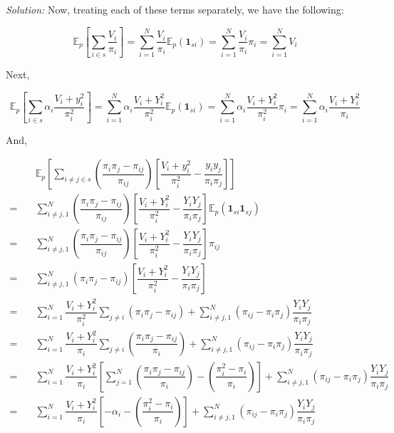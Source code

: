\documentclass[12pt]{article}
\newcommand{\E}{\mathbb{E}}
\theoremstyle{definition}
\newenvironment{answer}{\textit{Solution: }\quad }{ \hfill \qedsymbol}
\begin{document}
\begin{answer}
	Now, treating each of these terms separately, we have the following:

	$$\E_p \left[ \sum_{i \in s} \dfrac{V_i}{\pi_i} \right]
	= \sum_{i=1}^{N} \dfrac{V_i}{\pi_i} \E_p(\bm{1}_{si})
	= \sum_{i=1}^{N} \dfrac{V_i}{\pi_i} \pi_i
	= \sum_{i=1}^{N} V_i$$

	Next,

	$$\E_p \left[ \sum_{i \in s}\alpha_i \dfrac{V_i + y_i^2}{\pi_i^2} \right]
	= \sum_{i=1}^{N} \alpha_i \dfrac{V_i + Y_i^2}{\pi_i^2} \E_p(\bm{1}_{si})
	= \sum_{i=1}^{N} \alpha_i \dfrac{V_i + Y_i^2}{\pi_i^2} \pi_i
	= \sum_{i=1}^{N} \alpha_i \dfrac{V_i + Y_i^2}{\pi_i}$$


	And,

	\begin{align*}
		& \E_p \left[ \sum_{i \neq j \in s} \left( \dfrac{\pi_i \pi_j - \pi_{ij}}{\pi_{ij}} \right) \left[ \dfrac{V_i + y_i^2}{\pi_i^2} - \dfrac{y_i y_j}{\pi_i \pi_j} \right] \right]\\
		= \quad & \sum_{i\neq j, 1}^{N} \left( \dfrac{\pi_i \pi_j - \pi_{ij}}{\pi_{ij}} \right) \left[ \dfrac{V_i + Y_i^2}{\pi_i^2} - \dfrac{Y_i Y_j}{\pi_i \pi_j} \right] \E_p(\bm{1}_{si} \bm{1}_{sj})\\
		= \quad & \sum_{i\neq j, 1}^{N} \left( \dfrac{\pi_i \pi_j - \pi_{ij}}{\pi_{ij}} \right) \left[ \dfrac{V_i + Y_i^2}{\pi_i^2} - \dfrac{Y_i Y_j}{\pi_i \pi_j} \right] \pi_{ij}\\
		= \quad & \sum_{i\neq j, 1}^{N} \left( \pi_i \pi_j - \pi_{ij} \right) \left[ \dfrac{V_i + Y_i^2}{\pi_i^2} - \dfrac{Y_i Y_j}{\pi_i \pi_j} \right]\\
		= \quad & \sum_{i = 1}^{N} \dfrac{V_i + Y_i^2}{\pi_i^2} \sum_{j \neq i}\left( \pi_i \pi_j - \pi_{ij} \right)  + \sum_{i\neq j, 1}^{N} \left( \pi_{ij} - \pi_i \pi_j  \right) \dfrac{Y_i Y_j}{\pi_i \pi_j} \\
		= \quad & \sum_{i = 1}^{N} \dfrac{V_i + Y_i^2}{\pi_i} \sum_{j \neq i}\left( \dfrac{\pi_i \pi_j - \pi_{ij}}{\pi_i} \right)  + \sum_{i\neq j, 1}^{N} \left( \pi_{ij} - \pi_i \pi_j  \right) \dfrac{Y_i Y_j}{\pi_i \pi_j} \\
		= \quad & \sum_{i = 1}^{N} \dfrac{V_i + Y_i^2}{\pi_i} \left[\sum_{j = 1}^{N} \left( \dfrac{\pi_i \pi_j - \pi_{ij}}{\pi_i} \right) - \left(\dfrac{\pi_i^2 - \pi_i}{\pi_i}\right) \right]  + \sum_{i\neq j, 1}^{N} \left( \pi_{ij} - \pi_i \pi_j  \right) \dfrac{Y_i Y_j}{\pi_i \pi_j} \\
		= \quad & \sum_{i = 1}^{N} \dfrac{V_i + Y_i^2}{\pi_i} \left[-\alpha_i - \left(\dfrac{\pi_i^2 - \pi_i}{\pi_i}\right) \right]  + \sum_{i\neq j, 1}^{N} \left( \pi_{ij} - \pi_i \pi_j  \right) \dfrac{Y_i Y_j}{\pi_i \pi_j} \\
	\end{align*}


\end{answer}
\end{document}
